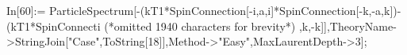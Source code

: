 In[60]:= ParticleSpectrum[-(kT1*SpinConnection[-i,a,i]*SpinConnection[-k,-a,k])-(kT1*SpinConnecti (*omitted 1940 characters for brevity*) ,k,-k]],TheoryName->StringJoin["Case",ToString[18]],Method->"Easy",MaxLaurentDepth->3];
